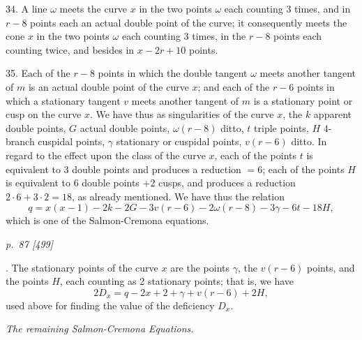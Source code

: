 \documentclass[11pt,a4paper]{article}
\newcommand{\pagemarker}[2]{\clearpage\noindent\textit{p.~#1 [#2]}\par\medskip}
\begin{document}
34. A line \(\omega\) meets the curve \(x\) in the two points \(\omega\) each counting 3
times, and in \(r-8\) points each an actual double point of the curve; it consequently
meets the cone \(x\) in the two points \(\omega\) each counting 3 times, in the \(r-8\)
points each counting twice, and besides in \(x-2r+10\) points.

35. Each of the \(r-8\) points in which the double tangent \(\omega\) meets another
tangent of \(m\) is an actual double point of the curve \(x\); and each of the \(r-6\)
points in which a stationary tangent \(v\) meets another tangent of \(m\) is a
stationary point or cusp on the curve \(x\). We have thus as singularities of the
curve \(x\), the \(k\) apparent double points, \(G\) actual double points,
\(\omega(r-8)\) ditto, \(t\) triple points, \(H\) 4-branch cuspidal points,
\(\gamma\) stationary or cuspidal points, \(v(r-6)\) ditto. In regard to the effect
upon the class of the curve \(x\), each of the points \(t\) is equivalent to 3 double
points and produces a reduction \(=6\); each of the points \(H\) is equivalent to
6 double points \(+2\) cusps, and produces a reduction \(2\cdot6+3\cdot2=18\), as
already mentioned. We have thus the relation
\[
  q=x(x-1)-2k-2G-3v(r-6)-2\omega(r-8)-3\gamma-6t-18H,
\]
which is one of the Salmon-Cremona equations.

\pagemarker{87}{499}
36. The stationary points of the curve \(x\) are the points \(\gamma\), the \(v(r-6)\)
points, and the points \(H\), each counting as 2 stationary points; that is, we have
\[
  2D_x=q-2x+2+\gamma+v(r-6)+2H,
\]
used above for finding the value of the deficiency \(D_x\).

\begin{center}\textit{The remaining Salmon-Cremona Equations.}\end{center}
\end{document}
